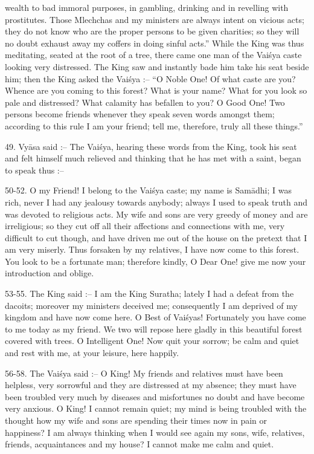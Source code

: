 wealth to bad immoral purposes, in gambling, drinking and in revelling with prostitutes. Those Mlechchas and my ministers are always intent on vicious acts; they do not know who are the proper persons to be given charities; so they will no doubt exhaust away my coffers in doing sinful acts.'' While the King was thus meditating, seated at the root of a tree, there came one man of the Vai\'sya caste looking very distressed. The King saw and instantly bade him take his seat beside him; then the King asked the Vai\'sya :-- ``O Noble One! Of what caste are you? Whence are you coming to this forest? What is your name? What for you look so pale and distressed? What calamity has befallen to you? O Good One! Two persons become friends whenever they speak seven words amongst them; according to this rule I am your friend; tell me, therefore, truly all these things.''

49. Vy\=asa said :-- The Vai\'sya, hearing these words from the King, took his seat and felt himself much relieved and thinking that he has met with a saint, began to speak thus :--

50-52. O my Friend! I belong to the Vai\'sya caste; my name is Sam\=adhi; I was rich, never I had any jealousy towards anybody; always I used to speak truth and was devoted to religious acts. My wife and sons are very greedy of money and are irreligious; so they cut off all their affections and connections with me, very difficult to cut though, and have driven me out of the house on the pretext that I am very miserly. Thus forsaken by my relatives, I have now come to this forest. You look to be a fortunate man; therefore kindly, O Dear One! give me now your introduction and oblige.

53-55. The King said :-- I am the King Suratha; lately I had a defeat from the dacoits; moreover my ministers deceived me; consequently I am deprived of my kingdom and have now come here. O Best of Vai\'syas! Fortunately you have come to me today as my friend. We two will repose here gladly in this beautiful forest covered with trees. O Intelligent One! Now quit your sorrow; be calm and quiet and rest with me, at your leisure, here happily.

56-58. The Vai\'sya said :-- O King! My friends and relatives must have been helpless, very sorrowful and they are distressed at my absence; they must have been troubled very much by diseases and misfortunes no doubt and have become very anxious. O King! I cannot remain quiet; my mind is being troubled with the thought how my wife and sons are spending their times now in pain or happiness? I am always thinking when I would see again my sons, wife, relatives, friends, acquaintances and my house? I cannot make me calm and quiet.

